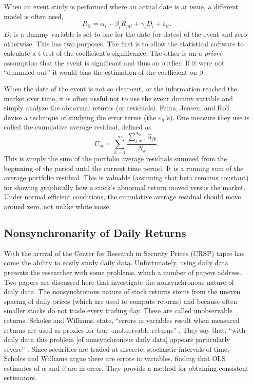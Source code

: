 When an event study is performed where an actual date is at
issue, a different model is often used,
\begin{equation}
R_{it}=\alpha_i+\beta_i R_{mt}+\gamma_i D_{i} +
\varepsilon_{it}.
\end{equation}
$D_{i}$ is a dummy variable is set to one for the date (or
dates) of the event and zero
otherwise.  This has two purposes.  The first is to allow 
the statistical software to calculate a t-test of the
coefficient's significance.  The other is an {\em a priori}
assumption that the event is significant and thus an
outlier.  If it were not ``dummied out'' it would bias the
estimation of the coefficient on $\beta$.

When the date of the event is not so clear-cut, or the
information reached the market over time, it is often useful
not to use the event dummy variable and simply analyze the
abnormal returns (or residuals).
Fama, Jensen, and Roll \cite{famaetal69}
devise a technique of studying the error terms
(the $\varepsilon_{it}$'s).  One measure they use is called the 
cumulative average residual, defined as
\begin{equation}
U_m=\sum_{k=1}^{m}\frac{\sum_{j=1}^{N_k}\hat u_{jk}}{N_{k}}.
\end{equation}
This is simply the sum of the portfolio average residuals summed from
the beginning of the period until the current time period.  It is a
running sum of the average portfolio residual.  This is valuable (assuming
that beta remains constant) for showing graphically how a
stock's abnormal return moved versus the market.  Under normal
efficient conditions, the cumulative average residual should move
around zero, not unlike white noise.

\subsection{Nonsynchronarity of Daily Returns}

With the arrival of the Center for
Research in Security Prices (CRSP) tapes has come the ability to
easily study daily data.  Unfortunately, using daily data
presents the researcher with some
problems, which a number of papers address.  Two papers are
discussed here that investigate the
nonsynchronous nature of daily data.  The nonsynchronous
nature of stock returns stems from the uneven spacing of
daily prices (which are used to compute returns) and because
often smaller stocks do not trade every trading day.  These
are called unobservable returns.
Scholes and Williams, state, ``errors in variables result when
measured
returns are used as proxies for true unobservable returns'' 
\cite[p. 311]{scholes77}. They say that, ``with daily data this 
problem [of nonsynchronous daily data] appears particularly
severe''
\cite[p. 309]{scholes77}.  Since securities are traded at
discrete, stochastic intervals of time, Scholes and Williams
argue there are errors in variables, finding that OLS
estimates of $\alpha$ and $\beta$ are in error.  They provide a method
for obtaining consistent estimators.

